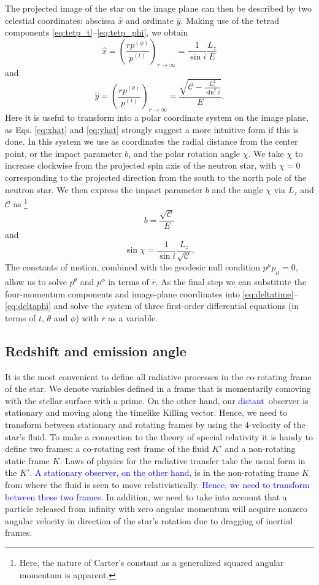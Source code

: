 \documentclass{aa}
\newcommand{\be}{\begin{equation}}
\newcommand{\ee}{\end{equation}}
\newcommand{\refe}[1]{\textcolor{blue}{{#1}}}
\newcommand{\Ca}{\ensuremath{\mathcal{C}}}
\newcommand{\rb}{\ensuremath{\bar{r}}}
\begin{document}
The projected image of the star on the image plane can then be described by two celestial coordinates:
abscissa $\hat{x}$ and ordinate $\hat{y}$.
Making use of the tetrad components \eqref{eq:tetp_t}--\eqref{eq:tetp_phi}, we obtain \citep[][p.347]{cha}
\be\label{eq:xhat}
\hat{x} = \left( \frac{rp^{(\phi)}}{p^{(t)}} \right)_{r \rightarrow \infty} = \frac{1}{\sin i} \frac{L_z}{E}
\ee
and
\be\label{eq:yhat}
\hat{y} = \left( \frac{rp^{(\theta)}}{p^{(t)}} \right)_{r \rightarrow \infty} = \frac{\sqrt{\Ca - \frac{L_z^2}{\sin^2 i}}}{E}.
\ee
Here it is useful to transform into a polar coordinate system on the image plane, as Eqs. \eqref{eq:xhat} and \eqref{eq:yhat} strongly suggest a more intuitive form if this is done. 
In this system we use as coordinates the radial distance from the center point, or the impact parameter $b$, and the polar rotation angle $\chi$.  
We take $\chi$ to increase clockwise from the projected spin axis of the neutron star, with $\chi=0$ corresponding to the projected direction from the south to the north pole of the neutron star.  
We then express the impact parameter $b$ and the angle $\chi$ via $L_z$ and $\Ca$ as%
\footnote{
    Here, the nature of Carter's constant as a generalized squared
    angular momentum is apparent.
}
\be
b = \frac{\sqrt{\Ca}}{E}
\ee
and
\be
\sin \chi = \frac{1}{\sin i} \frac{L_z}{\sqrt{\Ca}}.
\ee
The constants of motion, combined with the geodesic null condition $p^\mu p_\mu = 0$, allow us to solve $p^\theta$ and $p^\phi$ in terms of $\rb$.
As the final step we can substitute the four-momentum components and image-plane coordinates into \eqref{eq:deltatime}--\eqref{eq:deltaphi} and solve the system of three first-order differential equations (in terms of $t$, $\theta$ and $\phi$) with $\rb$ as a variable.


\subsection{Redshift and emission angle}\label{sect:redshift_angle}
It is the most convenient to define all radiative processes in the co-rotating frame of the star.
We denote variables defined in a frame that is momentarily comoving with the stellar surface with a prime.  
On the other hand, our \refe{distant} observer is stationary and moving along the timelike Killing vector.  
Hence, we need to transform between stationary and rotating frames by using the 4-velocity of the star's fluid.  
To make a connection to the theory of special relativity it is handy to define two frames: 
a co-rotating rest frame of the fluid $K'$ and a non-rotating static frame $K$.
Laws of physics for the radiative transfer take the usual form in the $K'$.
\refe{A stationary observer, on the other hand,} is in the non-rotating frame $K$ from where the fluid is seen to move relativistically.
\refe{Hence, we need to transform between these two frames.}
In addition, we need to take into account that a particle released from infinity with zero angular momentum will acquire nonzero angular velocity in direction of the star's rotation due to dragging of inertial frames.
\end{document}
